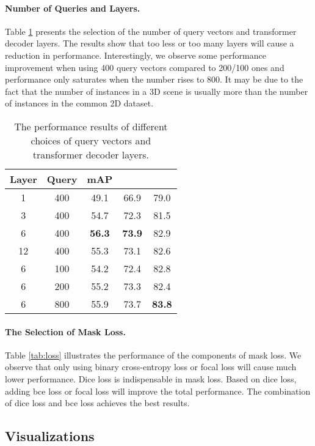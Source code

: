 \documentclass[letterpaper]{article} \usepackage{aaai23}  \usepackage{times}  \usepackage{helvet}  \usepackage{courier}  \usepackage[hyphens]{url}  \usepackage{graphicx} \urlstyle{rm} \def\UrlFont{\rm}  \usepackage{natbib}  \usepackage{caption} \frenchspacing  \setlength{\pdfpagewidth}{8.5in}  \setlength{\pdfpageheight}{11in}  \usepackage{algorithm}
\begin{document}
\paragraph{Number of Queries and Layers.} Table \ref{tab:layer query} presents the selection of the number of query vectors and transformer decoder layers. The results show that too less or too many layers will cause a reduction in performance. Interestingly, we observe some performance improvement when using 400 query vectors compared to 200/100 ones and performance only saturates when the number rises to 800. It may be due to the fact that the number of instances in a 3D scene is usually more than the number of instances in the common 2D dataset.


\begin{table}[!t]
    \centering
    \begin{tabular}{cc|ccc}
        \toprule
        Layer & Query & mAP &  &  \\
        \midrule
        1 & 400 & 49.1 & 66.9 & 79.0 \\
        3 & 400 & 54.7 & 72.3 & 81.5  \\
        6 & 400 & \textbf{56.3} & \textbf{73.9} & 82.9 \\
        12 & 400 & 55.3 & 73.1 & 82.6 \\
        6 & 100 & 54.2 & 72.4 & 82.8 \\
        6 & 200 & 55.2 & 73.3 & 82.4 \\
        6 & 800 & 55.9 & 73.7 & \textbf{83.8} \\
        \bottomrule
    \end{tabular}
    \caption{The performance results of different choices of query vectors and transformer decoder layers.}
    \label{tab:layer query}
\end{table}

\paragraph{The Selection of Mask Loss.} Table \ref{tab:loss} illustrates the performance of the components of mask loss. We observe that only using binary cross-entropy loss or focal \cite{focal} loss will cause much lower performance. Dice loss is indispensable in mask loss. Based on dice loss, adding bce loss or focal loss will improve the total performance. The combination of dice loss and bce loss achieves the best results. 

\subsection{Visualizations}
\end{document}
